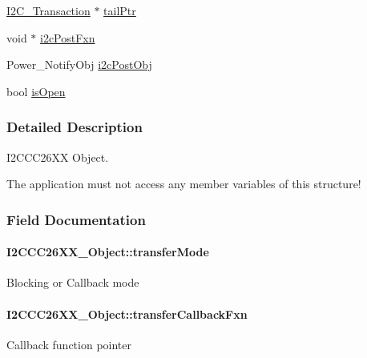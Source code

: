 \begin{DoxyCompactItemize}
\item 
\hyperlink{struct_i2_c___transaction}{I2\-C\-\_\-\-Transaction} $\ast$ \hyperlink{struct_i2_c_c_c26_x_x___object_a6cd1216ab6faa1e951186dfe696f841b}{tail\-Ptr}
\item 
void $\ast$ \hyperlink{struct_i2_c_c_c26_x_x___object_a6a7aaccb2b2b05d9fd9230924acf9e96}{i2c\-Post\-Fxn}
\item 
Power\-\_\-\-Notify\-Obj \hyperlink{struct_i2_c_c_c26_x_x___object_a2b16c813ec8f21896de5eecf03ed4178}{i2c\-Post\-Obj}
\item 
bool \hyperlink{struct_i2_c_c_c26_x_x___object_a4c74297d4652d9f61558ca4099867686}{is\-Open}
\end{DoxyCompactItemize}


\subsubsection{Detailed Description}
I2\-C\-C\-C26\-X\-X Object. 

The application must not access any member variables of this structure! 

\subsubsection{Field Documentation}
\paragraph[{transfer\-Mode}]{ I2\-C\-C\-C26\-X\-X\-\_\-\-Object\-::transfer\-Mode}\label{struct_i2_c_c_c26_x_x___object_a64cd64cf328013bebacf75feaa17f127}
Blocking or Callback mode 
\paragraph[{transfer\-Callback\-Fxn}]{ I2\-C\-C\-C26\-X\-X\-\_\-\-Object\-::transfer\-Callback\-Fxn}\label{struct_i2_c_c_c26_x_x___object_ad8faa83bb84c09307294134d9fd9d454}
Callback function pointer 
